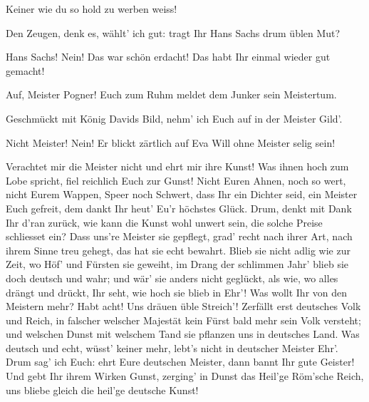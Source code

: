 \begin{drama}
Keiner wie du so hold zu werben weiss!

\Sachsspeaks
{}

Den Zeugen, denk es, wählt' ich gut:
tragt Ihr Hans Sachs drum üblen Mut?


Hans Sachs! Nein! Das war schön erdacht!
Das habt Ihr einmal wieder gut gemacht!


Auf, Meister Pogner! Euch zum Ruhm
meldet dem Junker sein Meistertum.

\Pognerspeaks
{}

Geschmückt mit König Davids Bild,
nehm' ich Euch auf in der Meister Gild'.

\Waltherspeaks
{}

Nicht Meister! Nein!
Er blickt zärtlich auf Eva
Will ohne Meister selig sein!


\Sachsspeaks
{}

Verachtet mir die Meister nicht
und ehrt mir ihre Kunst!
Was ihnen hoch zum Lobe spricht,
fiel reichlich Euch zur Gunst!
Nicht Euren Ahnen, noch so wert,
nicht Eurem Wappen, Speer noch Schwert,
dass Ihr ein Dichter seid,
ein Meister Euch gefreit,
dem dankt Ihr heut' Eu'r höchstes Glück.
Drum, denkt mit Dank Ihr d'ran zurück,
wie kann die Kunst wohl unwert sein,
die solche Preise schliesset ein?
Dass uns're Meister sie gepflegt,
grad' recht nach ihrer Art,
nach ihrem Sinne treu gehegt,
das hat sie echt bewahrt.
Blieb sie nicht adlig wie zur Zeit,
wo Höf' und Fürsten sie geweiht,
im Drang der schlimmen Jahr'
blieb sie doch deutsch und wahr;
und wär' sie anders nicht geglückt,
als wie, wo alles drängt und drückt,
Ihr seht, wie hoch sie blieb in Ehr'!
Was wollt Ihr von den Meistern mehr?
Habt acht! Uns dräuen üble Streich'!
Zerfällt erst deutsches Volk und Reich,
in falscher welscher Majestät
kein Fürst bald mehr sein Volk versteht;
und welschen Dunst mit welschem Tand
sie pflanzen uns in deutsches Land.
Was deutsch und echt, wüsst' keiner mehr,
lebt's nicht in deutscher Meister Ehr'.
Drum sag' ich Euch:
ehrt Eure deutschen Meister,
dann bannt Ihr gute Geister!
Und gebt Ihr ihrem Wirken Gunst,
zerging' in Dunst
das Heil'ge Röm'sche Reich,
uns bliebe gleich
die heil'ge deutsche Kunst!


\end{drama}

